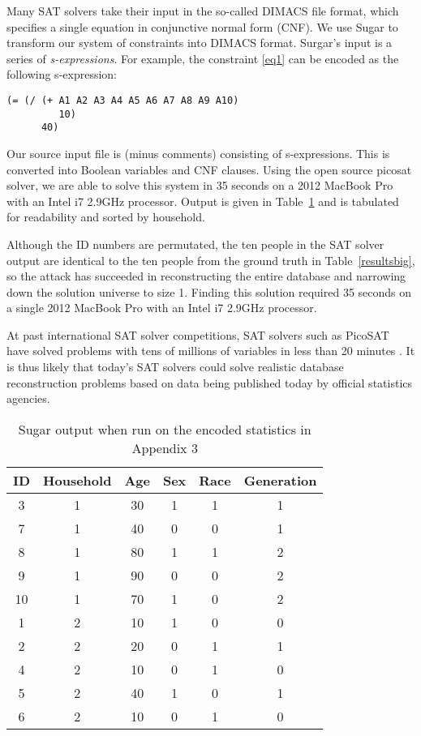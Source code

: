 \documentclass[runningheads]{llncs}
\begin{document}
Many SAT solvers take their input in the so-called DIMACS file format,
which specifies a single equation in conjunctive normal form (CNF). We use
Sugar\cite{sugar} to transform our system of constraints into DIMACS
format. Surgar's input is a series of
\textit{s-expressions}\cite{McCarthy:1960:RFS:367177.367199}. For
example, the constraint \ref{eq1} can be encoded as the following
s-expression:
\begin{verbatim}
(= (/ (+ A1 A2 A3 A4 A5 A6 A7 A8 A9 A10) 
         10) 
      40)
\end{verbatim}

Our source input file is \NumConstraintLines{} (minus comments)
consisting of \NumSExpressions s-expressions. This is converted into
\NumVaraibles Boolean variables and \NumClauses CNF clauses. Using the
open source picosat solver\cite{Biere_picosatessentials}, we are able
to solve this system in 35 seconds on a 2012 MacBook Pro with an Intel
i7 2.9GHz processor. Output is given in Table~\ref{sugarbig} and is
tabulated for readability and sorted by household. 

Although the ID numbers are permutated, the ten people in the SAT
solver output are identical to the ten people from the ground truth in
Table~\ref{resultsbig}, so the attack has succeeded in reconstructing
the entire database and narrowing down the solution universe to size
1. Finding this solution required 35 seconds on a single 2012 MacBook
Pro with an Intel i7 2.9GHz processor. 

At past international SAT
solver competitions, SAT solvers such as PicoSAT have solved problems
with tens of millions of variables in less than 20 minutes
\cite{satcomp}. It is thus likely that today's SAT solvers could solve
realistic database reconstruction problems based on data being
published today by official statistics agencies.


\begin{table}
\begin{tabular}{c|c|c|c|c|c}
ID & Household & Age & Sex & Race & Generation \\
\hline
 3 & 1 & 30 & 1 & 1 & 1  \\
 7 & 1 & 40 & 0 & 0 & 1  \\
 8 & 1 & 80 & 1 & 1 & 2  \\
 9 & 1 & 90 & 0 & 0 & 2 \\
10 & 1 & 70 & 1 & 0 & 2 \\
 1 & 2 & 10 & 1 & 0 & 0  \\
 2 & 2 & 20 & 0 & 1 & 1  \\
 4 & 2 & 10 & 0 & 1 & 0  \\
 5 & 2 & 40 & 1 & 0 & 1  \\
 6 & 2 & 10 & 0 & 1 & 0  \\
\hline
\end{tabular}
\caption{Sugar output when run on the encoded statistics in Appendix 3}\label{sugarbig}
\end{table}
\end{document}
